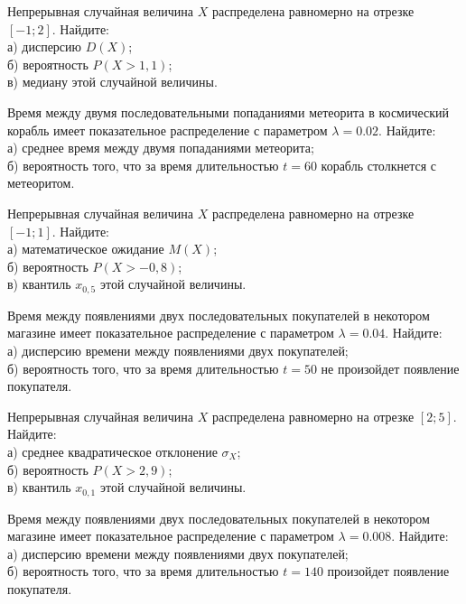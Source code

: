 \vfill

\newpage\setcounter{zad}{0}

\z Непрерывная случайная величина $X$ распределена равномерно на отрезке $[-1; 2]$. Найдите: \\ \quad а) дисперсию $D(X)$; \\ \quad б) вероятность $P(X>1{,}1)$; \\ \quad в) медиану этой случайной величины.


\vfill

\z Время между двумя последовательными попаданиями метеорита в космический корабль имеет показательное распределение с параметром $\lambda = 0.02$. Найдите: \\ \quad а) среднее время между двумя попаданиями метеорита; \\ \quad б) вероятность того, что за время длительностью $t = 60$ корабль  столкнется с метеоритом.
 

\vfill

\newpage\setcounter{zad}{0}

\z Непрерывная случайная величина $X$ распределена равномерно на отрезке $[-1; 1]$. Найдите: \\ \quad а) математическое ожидание $M(X)$; \\ \quad б) вероятность $P(X>-0{,}8)$; \\ \quad в) квантиль $x_{0{,}5}$ этой случайной величины.


\vfill

\z Время между появлениями двух последовательных покупателей в некотором магазине имеет показательное распределение с параметром $\lambda = 0.04$. Найдите: \\ \quad а) дисперсию времени между появлениями двух покупателей; \\ \quad б) вероятность того, что за время длительностью $t = 50$ не произойдет появление покупателя.
 

\vfill

\newpage\setcounter{zad}{0}

\z Непрерывная случайная величина $X$ распределена равномерно на отрезке $[2; 5]$. Найдите: \\ \quad а) среднее квадратическое отклонение $\sigma_X$; \\ \quad б) вероятность $P(X>2{,}9)$; \\ \quad в) квантиль $x_{0{,}1}$ этой случайной величины.


\vfill

\z Время между появлениями двух последовательных покупателей в некотором магазине имеет показательное распределение с параметром $\lambda = 0.008$. Найдите: \\ \quad а) дисперсию времени между появлениями двух покупателей; \\ \quad б) вероятность того, что за время длительностью $t = 140$  произойдет появление покупателя.
 

